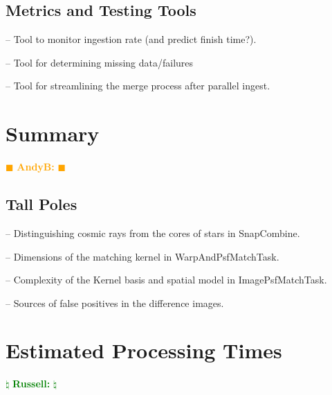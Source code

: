 \documentclass[prd, nofootinbib, floatfix, 11pt,tightenlines,times]{article}
\newcommand{\becker} { \textcolor{orange} {
\ensuremath{\blacksquare} {\bf AndyB:}  
\ensuremath{\blacksquare} } }
\newcommand{\russ} { \textcolor{green} {
\ensuremath{\natural} {\bf Russell:}  
\ensuremath{\natural} } }
\begin{document}
\subsection{Metrics and Testing Tools}

-- Tool to monitor ingestion rate (and predict finish time?).

-- Tool for determining missing data/failures

-- Tool for streamlining the merge process after parallel ingest.


\clearpage 
\section{Summary} \becker

\subsection{Tall Poles}

-- Distinguishing cosmic rays from the cores of stars in SnapCombine.

-- Dimensions of the matching kernel in WarpAndPsfMatchTask.

-- Complexity of the Kernel basis and spatial model in ImagePsfMatchTask.

-- Sources of false positives in the difference images.



\clearpage 
\section{Estimated Processing Times} \russ
\end{document}
